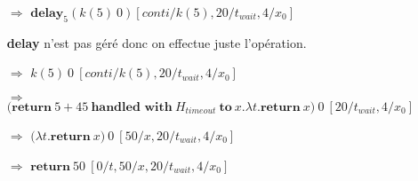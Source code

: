 \begin{exemple}
\begin{enumerate}
			\item[$\Rightarrow$] $\textbf{delay}_5(k(5)~0) [conti/k(5),20/t_{wait},4/x_0]$
			\item[]
			\bigbreak 
			\textbf{delay} n'est pas géré donc on effectue juste l'opération.
			\bigbreak
			\item[$\Rightarrow$] $k(5)~0~[conti/k(5),20/t_{wait},4/x_0]$
			\item[$\Rightarrow$] 
			$\textbf{(}\textbf{return}~5 + 45 ~\textbf{handled~with}~H_{timeout}~\textbf{to}~x.\lambda t.\textbf{return}~x\textbf{)}~0~[20/t_{wait},4/x_0]$
			\item[$\Rightarrow$]
			$\textbf{(}\lambda t.\textbf{return}~x\textbf{)}~0~[50/x,20/t_{wait},4/x_0]$
			\item[$\Rightarrow$] 
			$\textbf{return}~50~[0/t,50/x,20/t_{wait},4/x_0]$
		\end{enumerate}
		
	
		

\end{exemple}
